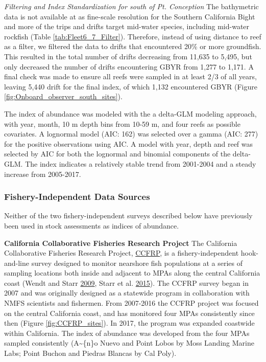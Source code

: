 \documentclass[12pt,]{article}
\begin{document}
\emph{Filtering and Index Standardization for south of Pt. Conception}
The bathymetric data is not available at as fine-scale resolution for
the Southern California Bight and more of the trips and drifts target
mid-water species, including mid-water rockfish (Table
\ref{tab:Fleet6_7_Filter}). Therefore, instead of using distance to reef
as a filter, we filtered the data to drifts that encountered 20\% or
more groundfish. This resulted in the total number of drifts decreasing
from 11,635 to 5,495, but only decreased the number of drifts
encountering GBYR from 1,277 to 1,171. A final check was made to ensure
all reefs were sampled in at least 2/3 of all years, leaving 5,440 drift
for the final index, of which 1,132 encountered GBYR (Figure
\ref{fig:Onboard_observer_south_sites}).

The index of abundance was modeled with the a delta-GLM modeling
approach, with year, month, 10 m depth bins from 10-59 m, and four reefs
as possible covariates. A lognormal model (AIC: 162) was selected over a
gamma (AIC: 277) for the positive observations using AIC. A model with
year, depth and reef was selected by AIC for both the lognormal and
binomial components of the delta-GLM. The index indicates a relatively
stable trend from 2001-2004 and a steady increase from 2005-2017.

\subsubsection{Fishery-Independent Data
Sources}\label{fishery-independent-data-sources}

Neither of the two fishery-independent surveys described below have
previously been used in stock assessments as indices of abundance.

\textbf{California Collaborative Fisheries Research Project} The
California Collaborative Fisheries Research Project,
\href{https://www.mlml.calstate.edu/ccfrp/}{CCFRP}, is a
fishery-independent hook-and-line survey designed to monitor nearshore
fish populations at a series of sampling locations both inside and
adjacent to MPAs along the central California coast (Wendt and Starr
\protect\hyperlink{ref-Wendt2009}{2009}, Starr et al.
\protect\hyperlink{ref-Starr2015}{2015}). The CCFRP survey began in 2007
and was originally designed as a statewide program in collaboration with
NMFS scientists and fishermen. From 2007-2016 the CCFRP project was
focused on the central California coast, and has monitored four MPAs
consistently since then (Figure \ref{fig:CCFRP_sites}). In 2017, the
program was expanded coastwide within California. The index of abundance
was developed from the four MPAs sampled consistently
(A\textasciitilde{}\{n\}o Nuevo and Point Lobos by Moss Landing Marine
Labs; Point Buchon and Piedras Blancas by Cal Poly).
\end{document}
